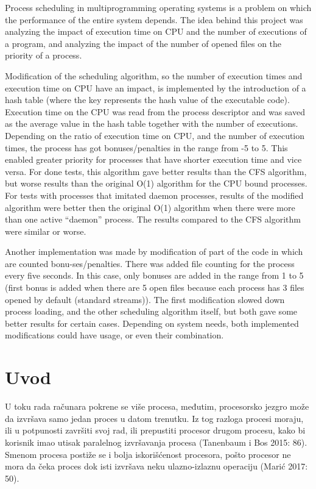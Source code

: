 \begin{AbstractEng}
Process scheduling in multiprogramming operating systems is a problem on which the performance of the entire system depends. The idea behind this project was analyzing the impact of execution time on CPU and the number of executions of a program, and analyzing the impact of the number of opened files on the priority of a process.

Modification of the scheduling algorithm, so the number of execution times and execution time on CPU have an impact, is implemented by the introduction of a hash table (where the key represents the hash value of the executable code). Execution time on the CPU was read from the process descriptor and was saved as the average value in the hash table together with the number of executions. Depending on the ratio of execution time on CPU, and the number of execution times, the process has got bonuses/penalties in the range from -5 to 5. This enabled greater priority for processes that have shorter execution time and vice versa. For done tests, this algorithm gave better results than the CFS algorithm, but worse results than the original O(1) algorithm for the CPU bound processes. For tests with processes that imitated daemon processes, results of the modified algorithm were better then the original O(1) algorithm when there were more than one active “daemon” process. The results compared to the CFS algorithm were similar or worse.

Another implementation was made by modification of part of the code in which are counted bonu-ses/penalties. There was added file counting for the process every five seconds. In this case, only bonuses are added in the range from 1 to 5 (first bonus is added when there are 5 open files because each process has 3 files opened by default (standard streams)). The first modification slowed down process loading, and the other scheduling algorithm itself, but both gave some better results for certain cases. Depending on system needs, both implemented modifications could have usage, or even their combination.
\end{AbstractEng}

\StartDoublePaper
\label{rac.diana}

\section{Uvod}

U toku rada računara pokrene se više procesa, međutim, procesorsko jezgro može da izvršava samo jedan proces u datom trenutku. Iz tog razloga procesi moraju, ili u potpunosti završiti svoj rad, ili prepustiti procesor drugom procesu, kako bi korisnik imao utisak paralelnog izvršavanja procesa (Tanenbaum i Bos 2015: 86). Smenom procesa postiže se i bolja iskorišćenost procesora, pošto procesor ne mora da čeka proces dok isti izvršava neku ulazno-izlaznu operaciju (Marić 2017: 50).

